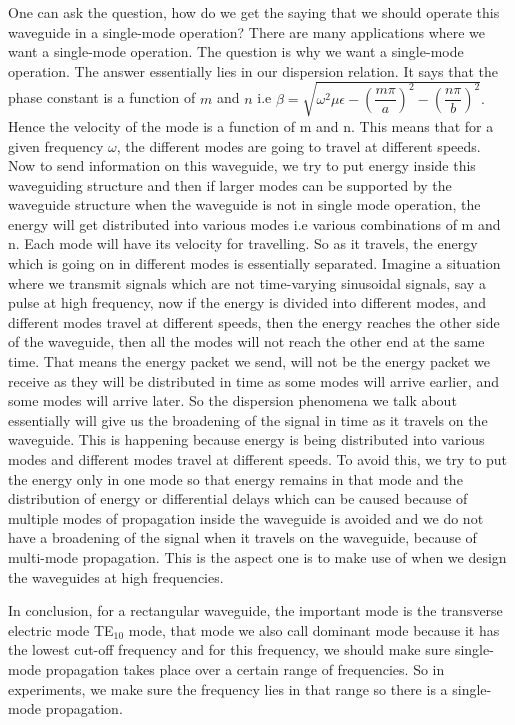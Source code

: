 One can ask the question, how do we get the saying that we should operate this waveguide in a single-mode operation? There are many applications where we want a single-mode operation. The question is why we want a single-mode operation. The answer essentially lies in our dispersion relation. It says that the phase constant is a function of $m$ and $n$ i.e $\beta = \sqrt{{\omega}^2\mu\epsilon - \left(\dfrac{m\pi}{a}\right)^2 - \left(\dfrac{n\pi}{b}\right)^2}.$ Hence the velocity of the mode is a function of m and n. This means that for a given frequency $\omega$, the different modes are going to travel at different speeds. Now to send information on this waveguide, we try to put energy inside this waveguiding structure and then if larger modes can be supported by the waveguide structure when the waveguide is not in single mode operation, the energy will get distributed into various modes i.e various combinations of m and n. Each mode will have its velocity for travelling. So as it travels, the energy which is going on in different modes is essentially separated. Imagine a situation where we transmit signals which are not time-varying sinusoidal signals, say a pulse at high frequency, now if the energy is divided into different modes, and different modes travel at different speeds, then the energy reaches the other side of the waveguide, then all the modes will not reach the other end at the same time. That means the energy packet we send, will not be the energy packet we receive as they will be distributed in time as some modes will arrive earlier, and some modes will arrive later. So the dispersion phenomena we talk about essentially will give us the broadening of the signal in time as it travels on the waveguide. This is happening because energy is being distributed into various modes and different modes travel at different speeds. To avoid this, we try to put the energy only in one mode so that energy remains in that mode and the distribution of energy or differential delays which can be caused because of multiple modes of propagation inside the waveguide is avoided and we do not have a broadening of the signal when it travels on the waveguide, because of multi-mode propagation. This is the aspect one is to make use of when we design the waveguides at high frequencies.

In conclusion, for a rectangular waveguide, the important mode is the transverse electric mode TE$_{10}$ mode, that mode we also call dominant mode because it has the lowest cut-off frequency and for this frequency, we should make sure single-mode propagation takes place over a certain range of frequencies. So in experiments, we make sure the frequency lies in that range so there is a single-mode propagation.

